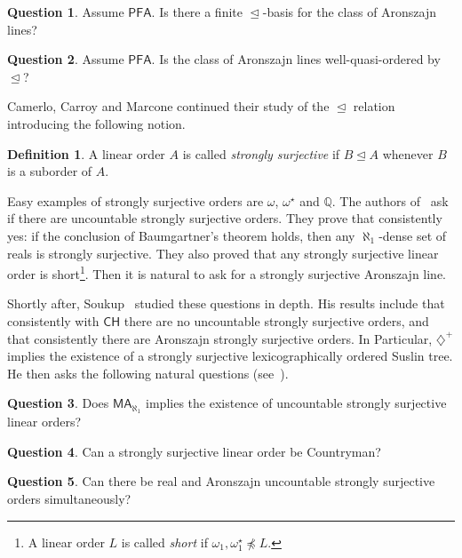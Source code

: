 \documentclass[10pt]{amsart}
\theoremstyle{definition}
\newtheorem{definition}[theorem]{Definition}
\newtheorem{question}{Question}
\theoremstyle{remark}
\newcommand{\axiom}[1]{\mathsf{#1}}
\newcommand{\CH}{\axiom{CH}}
\newcommand{\MA}{\axiom{MA}}
\newcommand{\PFA}{\axiom{PFA}}
\newcommand{\neleq}{\npreceq}
\newcommand{\sleq}{\trianglelefteq}
\newcommand{\1}{\mathbbm{1}}
\begin{document}
\begin{question}\label{q:sur-basis}
  Assume $\PFA$. Is there a finite $\sleq$-basis for the class of Aronszajn lines?
\end{question}

\begin{question}\label{q:sur-wqo}
  Assume $\PFA$. Is the class of Aronszajn lines well-quasi-ordered by $\sleq$?
\end{question}

Camerlo, Carroy and Marcone continued\cite{CamerloEtAl2019} their
study of the $\sleq$ relation introducing the following notion.

\begin{definition}
  A linear order $A$ is called \emph{strongly surjective} if
  $B \sleq A$ whenever $B$ is a suborder of $A$.
\end{definition}

Easy examples of strongly surjective orders are $\omega$, $\omega^{\star}$ and
$\mathbb{Q}$. The authors of~\cite{CamerloEtAl2019} ask if there
are uncountable strongly surjective orders. They prove that consistently
yes: if the conclusion of Baumgartner's theorem holds,
then any $\aleph_{1}$-dense set of reals is strongly surjective. They also
proved that any strongly surjective linear order is short\footnote{
  A linear order $L$ is called \emph{short} if $\omega_{1},\omega_{1}^{\star}\neleq L$.}.
Then it is natural to ask for a strongly surjective Aronszajn line.

Shortly after, Soukup~\cite{Soukup} studied these questions in depth. His
results include that
consistently with $\CH$ there are no uncountable strongly
surjective orders, and that consistently there are Aronszajn strongly surjective
orders. In Particular, $\diamondsuit^{+}$ implies the existence of a
strongly surjective lexicographically ordered Suslin tree. He then
asks the following natural questions (see~\cite[Problems~40, 41 and 46]{Soukup}).

\begin{question}\label{q:ma->srs}
  Does $\MA_{\aleph_{1}}$ implies the existence of uncountable
  strongly surjective linear orders?
\end{question}

\begin{question}\label{q:srs-cline}
  Can a strongly surjective linear order be Countryman?
\end{question}

\begin{question}\label{q:srs-real-aronszajn}
  Can there be real and Aronszajn uncountable strongly surjective orders
  simultaneously?
\end{question}
\end{document}
